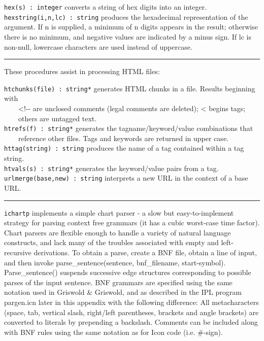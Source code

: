 \texttt{hex(s) : integer} converts a string of hex digits into an
integer.\\
\texttt{hexstring(i,n,lc) : string} produces the
hexadecimal representation of the argument. If n is
supplied, a minimum of n digits appears in the result; otherwise there
is no minimum, and negative values are indicated by a minus sign. If lc
is non-null, lowercase characters are used instead of uppercase.

\vspace{0.25cm}\hrule{}

These procedures assist in processing HTML files:

\texttt{htchunks(file) : string*} generates HTML chunks in a
file. Results beginning with\\
 \ \ \ \ {\textless}!-{}- are unclosed comments
(legal comments are deleted); {\textless} begins tags;\\
 \ \ \ \ others are untagged text.\\
\texttt{htrefs(f) : string*} generates the tagname/keyword/value
combinations that\\
 \ \ \ \ reference other files. Tags and
keywords are returned in upper case.\\
\texttt{httag(string) : string} produces the name of a tag contained
within a tag string.\\
\texttt{htvals(s) : string*} generates the keyword/value pairs from a
tag.\\
\texttt{urlmerge(base,new) : string} interprets a new URL in the context
of a base URL.

\vspace{0.25cm}\hrule{}

\texttt{ichartp} implements a simple chart
parser - a slow but easy-to-implement strategy for parsing
context free grammars (it has a cubic worst-case time factor). Chart
parsers are flexible enough to handle a variety of natural language
constructs, and lack many of the troubles associated with empty and
left-recursive derivations. To obtain a parse, create a BNF
file, obtain a line of input, and then invoke parse\_sentence(sentence,
bnf\_filename, start-symbol). Parse\_sentence() suspends successive
edge structures corresponding to possible parses of the input sentence.
BNF grammars are specified using the same notation used in Griswold \&
Griswold, and as described in the IPL program
{\textquotedbl}pargen.icn{\textquotedbl} later in this appendix with
the following difference: All metacharacters (space, tab, vertical
slash, right/left parentheses, brackets and angle brackets) are
converted to literals by prepending a backslash. Comments can be
included along with BNF rules using the same notation as for Icon code
(i.e. \#-sign).

